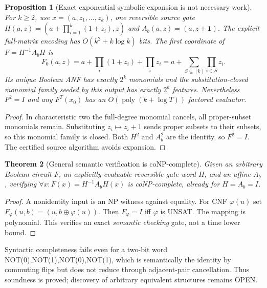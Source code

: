 \documentclass[11pt]{article}
\newtheorem{theorem}{Theorem}
\newtheorem{proposition}[theorem]{Proposition}
\begin{document}
\begin{proposition}[Exact exponential symbolic expansion is not necessary work]
For $k\ge2$, use $x=(a,z_1,\dots,z_k)$, one reversible source gate $H(a,z)=(a+\prod_{i=1}^k(1+z_i),z)$ and $A_b(a,z)=(a,z+\mathbf1)$. The explicit full-matrix encoding has $O(k^2+k\log k)$ bits. The first coordinate of $F=H^{-1}A_bH$ is
\[
F_0(a,z)=a+\prod_i(1+z_i)+\prod_i z_i
=a+\sum_{S\subsetneq[k]} \prod_{i\in S}z_i.
\]
Its unique Boolean ANF has exactly $2^k$ monomials and the substitution-closed monomial family seeded by this output has exactly $2^k$ features. Nevertheless $F^2=I$ and any $F^T(x_0)$ has an $O(\operatorname{poly}(k+\log T))$ factored evaluator.
\end{proposition}
\begin{proof}
In characteristic two the full-degree monomial cancels, all proper-subset monomials remain. Substituting $z_i\mapsto z_i+1$ sends proper subsets to their subsets, so this monomial family is closed. Both $H^2$ and $A_b^2$ are the identity, so $F^2=I$. The certified source algorithm avoids expansion.
\end{proof}

\begin{theorem}[General semantic verification is coNP-complete]
Given an arbitrary Boolean circuit $F$, an explicitly evaluable reversible gate-word $H$, and an affine $A_b$, verifying $\forall x:F(x)=H^{-1}A_bH(x)$ is coNP-complete, already for $H=A_b=I$.
\end{theorem}
\begin{proof}
A nonidentity input is an NP witness against equality. For CNF $\varphi(u)$ set $F_\varphi(u,b)=(u,b\oplus\varphi(u))$. Then $F_\varphi=I$ iff $\varphi$ is UNSAT. The mapping is polynomial. This verifies an exact \emph{semantic checking} gate, not a time lower bound.
\end{proof}
Syntactic completeness fails even for a two-bit word NOT(0),NOT(1),NOT(0),NOT(1), which is semantically the identity by commuting flips but does not reduce through adjacent-pair cancellation. Thus soundness is proved; discovery of arbitrary equivalent structures remains OPEN.
\end{document}
